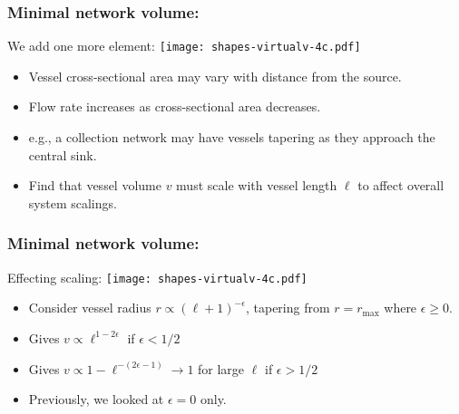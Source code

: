 \begin{frame}
  \frametitle{Minimal network volume:}

  \begin{block}{We add one more element:}
    \texttt{[image: shapes-virtualv-4c.pdf]}
    \begin{itemize}
    \item Vessel cross-sectional area
      may vary with distance from the source.
    \item
      Flow rate increases as cross-sectional area decreases.
    \item e.g., a collection network may
      have vessels tapering as they approach
      the central sink.
    \item
      Find that vessel volume $v$ must scale
      with vessel length $\ell$ to affect overall
      system scalings.
    \end{itemize}
  \end{block}
\end{frame}

\begin{frame}
  \frametitle{Minimal network volume:}

  \begin{block}{Effecting scaling:}
    \texttt{[image: shapes-virtualv-4c.pdf]}
    \begin{itemize}
    \item
      Consider vessel radius $r \propto (\ell+1)^{-\epsilon}$,
      tapering from $r=r_{\max}$ where $\epsilon \ge 0$.
    \item
      Gives
      $
      v \propto \ell^{1-2\epsilon}
      $ if $\epsilon < 1/2$
    \item
      Gives
      $
      v \propto 1 - \ell^{-(2\epsilon-1)} \rightarrow 1$ for large $\ell$
      if $\epsilon > 1/2$
    \item
      Previously, we looked at $\epsilon=0$ only.
    \end{itemize}
  \end{block}
\end{frame}

